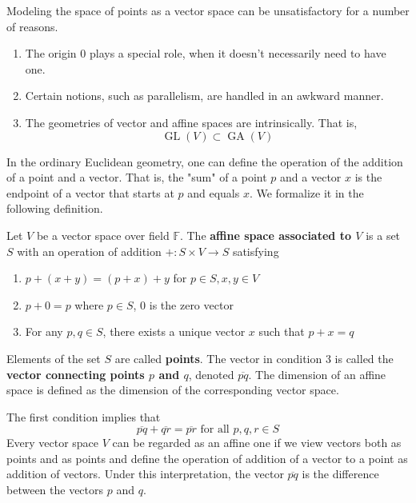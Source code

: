 \documentclass{article}
\DeclareMathOperator{\GL}{GL}
\DeclareMathOperator{\GA}{GA}
\begin{document}
    Modeling the space of points as a vector space can be unsatisfactory for a number of reasons. 
    \begin{enumerate}
      \item The origin $0$ plays a special role, when it doesn't necessarily need to have one. 
      \item Certain notions, such as parallelism, are handled in an awkward manner. 
      \item The geometries of vector and affine spaces are intrinsically. That is, 
        \begin{equation}
          \GL(V) \subset \GA(V)
        \end{equation}
    \end{enumerate}

    In the ordinary Euclidean geometry, one can define the operation of the addition of a point and a vector. That is, the "sum" of a point $p$ and a vector $x$ is the endpoint of a vector that starts at $p$ and equals $x$. We formalize it in the following definition. 

    \begin{definition}
      Let $V$ be a vector space over field $\mathbb{F}$. The \textbf{affine space associated to $V$} is a set $S$ with an operation of addition $+: S \times V \longrightarrow S$ satisfying 
      \begin{enumerate}
        \item $p + (x + y) = (p + x) + y$ for $p \in S, x, y \in V$
        \item $p + 0 = p$ where $p \in S$, $0$ is the zero vector 
        \item For any $p, q \in S$, there exists a unique vector $x$ such that $p + x = q$
      \end{enumerate}
      Elements of the set $S$ are called \textbf{points}. The vector in condition 3 is called the \textbf{vector connecting points $p$ and $q$}, denoted $\overline{pq}$. The dimension of an affine space is defined as the dimension of the corresponding vector space. 
    \end{definition}

    The first condition implies that
    \begin{equation}
      \overline{pq} + \overline{qr} = \overline{pr} \text{ for all } p, q, r \in S
    \end{equation}
    Every vector space $V$ can be regarded as an affine one if we view vectors both as points and as points and define the operation of addition of a vector to a point as addition of vectors. Under this interpretation, the vector $\overline{pq}$ is the difference between the vectors $p$ and $q$. 
\end{document}
